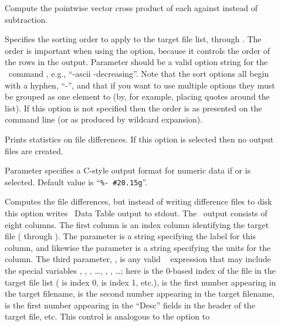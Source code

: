 \begin{description}
\item[]
  Compute the pointwise vector cross product
  of each  against  instead of subtraction.
\item[]
  Specifies the sorting order to apply to the target file list,
   through .  The order is important when using
  the  option, because it controls the order of the rows in the
  output.  Parameter  should be a valid option string for the
  \Tcl\ command , e.g., ``-ascii -decreasing''.  Note that the
   sort options all begin with a hyphen, ``-'', and that if
  you want to use multiple options they must be grouped as one element
  to  (by, for example, placing quotes around the list).
  If this option is not specified then the order is as presented on the
  command line (or as produced by wildcard expansion).
\item[]
  Prints statistics on file differences.  If this option is selected
  then no output files are created.
\item[]
  Parameter  specifies a C-style output format for numeric data if
   or  is selected.  Default value is
  ``\verb+%- #20.15g+''.
\item[]
  Computes the file differences, but instead of writing difference files
  to disk this option writes \OOMMF\ Data Table
   output to
  stdout.  The \ODT\ output consists of eight columns.  The first column
  is an index column identifying the target file ( through
  ).  The  parameter is a string specifying the
  label for this column, and likewise the  parameter is a
  string specifying the units for the column.  The third parameter,
  , is any valid \Tcl\  expression that may
  include the special variables , , , \ldots,
  , , \ldots; here  is the 0-based index of
  the file in the target file list ( is index 0, 
  is index 1, etc.),  is the first number appearing in the
  target filename,  is the second number appearing in the target
  filename,  is the first number appearing in the ``Desc''
  fields in the header of the target file, etc.  This control is
  analogous to the  option to 

\end{description}

